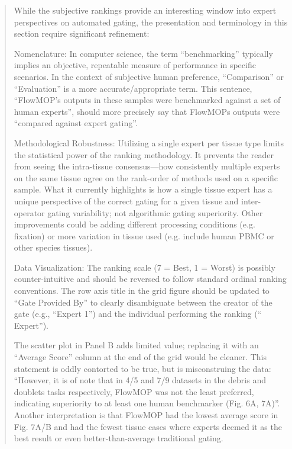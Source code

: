 \documentclass[
  11pt,
  a4paper,
]{article}
\begin{document}
\begin{quote}
While the subjective rankings provide an interesting window into expert
perspectives on automated gating, the presentation and terminology in
this section require significant refinement:

Nomenclature: In computer science, the term ``benchmarking'' typically
implies an objective, repeatable measure of performance in specific
scenarios. In the context of subjective human preference, ``Comparison''
or ``Evaluation'' is a more accurate/appropriate term. This sentence,
``FlowMOP's outputs in these samples were benchmarked against a set of
human experts'', should more precisely say that
FlowMOP\textquotesingle s outputs were ``compared against expert
gating''.

Methodological Robustness: Utilizing a single expert per tissue type
limits the statistical power of the ranking methodology. It prevents the
reader from seeing the intra-tissue consensus---how consistently
multiple experts on the same tissue agree on the rank-order of methods
used on a specific sample. What it currently highlights is how a single
tissue expert has a unique perspective of the correct gating for a given
tissue and inter-operator gating variability; not algorithmic gating
superiority. Other improvements could be adding different processing
conditions (e.g. fixation) or more variation in tissue used (e.g.
include human PBMC or other species\textquotesingle{} tissues).

Data Visualization: The ranking scale (7 = Best, 1 = Worst) is possibly
counter-intuitive and should be reversed to follow standard ordinal
ranking conventions. The row axis title in the grid figure should be
updated to ``Gate Provided By'' to clearly disambiguate between the
creator of the gate (e.g., ``Expert 1'') and the individual performing
the ranking (`` Expert'').

The scatter plot in Panel B adds limited value; replacing it with an
``Average Score'' column at the end of the grid would be cleaner. This
statement is oddly contorted to be true, but is misconstruing the data:
``However, it is of note that in 4/5 and 7/9 datasets in the debris and
doublets tasks respectively, FlowMOP was not the least preferred,
indicating superiority to at least one human benchmarker (Fig. 6A,
7A)''. Another interpretation is that FlowMOP had the lowest average
score in Fig. 7A/B and had the fewest tissue cases where experts deemed
it as the best result or even better-than-average traditional gating.
\end{quote}
\end{document}
